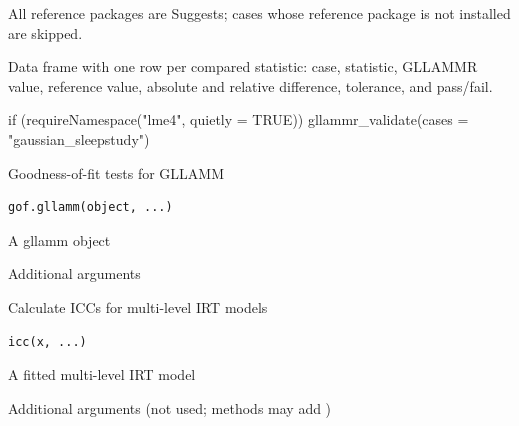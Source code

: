 \documentclass[a4paper]{book}
\begin{document}
%
\begin{Details}
All reference packages are Suggests; cases whose reference package is not
installed are skipped.
\end{Details}
%
\begin{Value}
Data frame with one row per compared statistic: case, statistic,
GLLAMMR value, reference value, absolute and relative difference,
tolerance, and pass/fail.
\end{Value}
%
\begin{Examples}
\begin{ExampleCode}

if (requireNamespace("lme4", quietly = TRUE)) {
  gllammr_validate(cases = "gaussian_sleepstudy")
}


\end{ExampleCode}
\end{Examples}
%
\begin{Description}
Goodness-of-fit tests for GLLAMM
\end{Description}
%
\begin{Usage}
\begin{verbatim}
gof.gllamm(object, ...)
\end{verbatim}
\end{Usage}
%
\begin{Arguments}
\begin{ldescription}
\item[\code{object}] A gllamm object

\item[\code{...}] Additional arguments
\end{ldescription}
\end{Arguments}
%
\begin{Description}
Calculate ICCs for multi-level IRT models
\end{Description}
%
\begin{Usage}
\begin{verbatim}
icc(x, ...)
\end{verbatim}
\end{Usage}
%
\begin{Arguments}
\begin{ldescription}
\item[\code{x}] A fitted multi-level IRT model

\item[\code{...}] Additional arguments (not used; methods may add )
\end{ldescription}
\end{Arguments}
\end{document}
